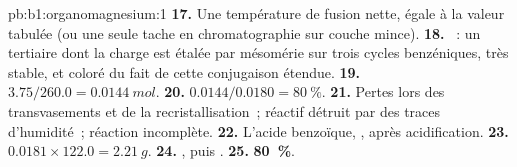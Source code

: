 \begin{solution}{pb:b1:organomagnesium:1}
\textbf{17.} Une température de fusion nette, égale à la valeur tabulée
(ou une seule tache en chromatographie sur couche mince).
\textbf{18.} ~: un 
tertiaire dont la charge est étalée par mésomérie sur trois cycles
benzéniques, très stable, et coloré du fait de cette conjugaison étendue.
\textbf{19.} $3.75/260.0 = \qty{0.0144}{mol}$.
\textbf{20.} $0.0144/0.0180 = \qty{80}{\percent}$.
\textbf{21.} Pertes lors des transvasements et de la recristallisation~;
réactif détruit par des traces d'humidité~; réaction incomplète.
\textbf{22.} L'acide benzoïque, , après acidification.
\textbf{23.} $0.0181 \times 122.0 = \qty{2.21}{g}$.
\textbf{24.} , puis
.
\textbf{25.} \textbf{\qty{80}{\percent}}.
\end{solution}
